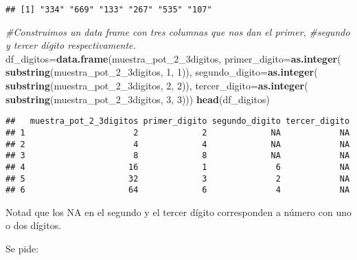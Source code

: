 \documentclass[
]{article}
\newenvironment{Shaded}{\begin{snugshade}}{\end{snugshade}}
\newcommand{\CommentTok}[1]{\textcolor[rgb]{0.56,0.35,0.01}{\textit{#1}}}
\newcommand{\DataTypeTok}[1]{\textcolor[rgb]{0.13,0.29,0.53}{#1}}
\newcommand{\DecValTok}[1]{\textcolor[rgb]{0.00,0.00,0.81}{#1}}
\newcommand{\KeywordTok}[1]{\textcolor[rgb]{0.13,0.29,0.53}{\textbf{#1}}}
\newcommand{\NormalTok}[1]{#1}
\begin{document}
\begin{verbatim}
## [1] "334" "669" "133" "267" "535" "107"
\end{verbatim}

\begin{Shaded}
\begin{Highlighting}[]
\CommentTok{#Construimos un data frame con tres columnas que nos dan el primer, }
\CommentTok{#segundo y tercer dígito respectivamente.}
\NormalTok{df_digitos=}\KeywordTok{data.frame}\NormalTok{(muestra_pot_}\DecValTok{2}\NormalTok{_3digitos,}
                      \DataTypeTok{primer_digito=}\KeywordTok{as.integer}\NormalTok{(}
                        \KeywordTok{substring}\NormalTok{(muestra_pot_}\DecValTok{2}\NormalTok{_3digitos, }\DecValTok{1}\NormalTok{, }\DecValTok{1}\NormalTok{)),}
                      \DataTypeTok{segundo_digito=}\KeywordTok{as.integer}\NormalTok{(}
                        \KeywordTok{substring}\NormalTok{(muestra_pot_}\DecValTok{2}\NormalTok{_3digitos, }\DecValTok{2}\NormalTok{, }\DecValTok{2}\NormalTok{)),}
                      \DataTypeTok{tercer_digito=}\KeywordTok{as.integer}\NormalTok{(}
                        \KeywordTok{substring}\NormalTok{(muestra_pot_}\DecValTok{2}\NormalTok{_3digitos, }\DecValTok{3}\NormalTok{, }\DecValTok{3}\NormalTok{)))}
\KeywordTok{head}\NormalTok{(df_digitos)}
\end{Highlighting}
\end{Shaded}

\begin{verbatim}
##   muestra_pot_2_3digitos primer_digito segundo_digito tercer_digito
## 1                      2             2             NA            NA
## 2                      4             4             NA            NA
## 3                      8             8             NA            NA
## 4                     16             1              6            NA
## 5                     32             3              2            NA
## 6                     64             6              4            NA
\end{verbatim}

Notad que los NA en el segundo y el tercer dígito corresponden a número
con uno o dos dígitos.

Se pide:
\end{document}
